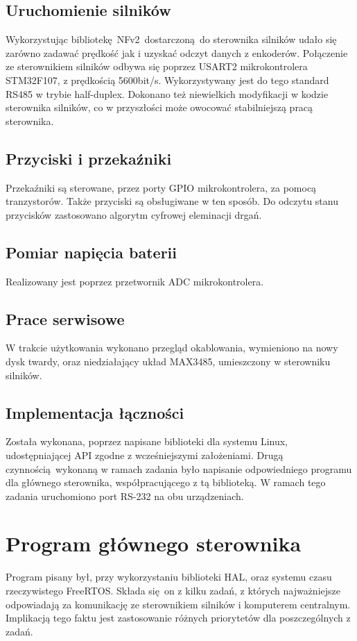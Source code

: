 \documentclass[10pt,a4paper]{article}
\begin{document}
	\subsection{Uruchomienie silników}
	Wykorzystując bibliotekę NFv2 dostarczoną do sterownika silników udało się zarówno zadawać prędkość jak i uzyskać odczyt danych z enkoderów. Połączenie ze sterownikiem silników odbywa się poprzez USART2 mikrokontrolera STM32F107, z prędkością 5600bit/s. Wykorzystywany jest do tego standard RS485 w trybie half-duplex. Dokonano też niewielkich modyfikacji w kodzie sterownika silników, co w przyszłości może owocować stabilniejszą pracą sterownika.
	\subsection{Przyciski i przekaźniki}
	Przekaźniki są sterowane, przez porty GPIO mikrokontrolera, za pomocą tranzystorów. Także przyciski są obsługiwane w ten sposób. Do odczytu stanu przycisków zastosowano algorytm cyfrowej eleminacji drgań.
	\subsection{Pomiar napięcia baterii}
	Realizowany jest poprzez przetwornik ADC mikrokontrolera.
	\subsection{Prace serwisowe}
	W trakcie użytkowania wykonano przegląd okablowania, wymieniono na nowy dysk twardy, oraz niedziałający układ MAX3485, umieszczony w sterowniku silników.
	\subsection{Implementacja łączności}
	Została wykonana, poprzez napisane biblioteki dla systemu Linux, udostępniającej API zgodne z wcześniejszymi założeniami. Drugą czynnością wykonaną w ramach zadania było napisanie odpowiedniego programu dla głównego sterownika, współpracującego z tą biblioteką. W ramach tego zadania uruchomiono port RS-232 na obu urządzeniach.
	
	\section{Program głównego sterownika}
	Program pisany był, przy wykorzystaniu biblioteki HAL, oraz systemu czasu rzeczywistego FreeRTOS. Składa się on z kilku zadań, z których najważniejsze odpowiadają za komunikację ze sterownikiem silników i komputerem centralnym. Implikacją tego faktu jest zastosowanie różnych priorytetów dla poszczególnych z zadań.
\end{document}

